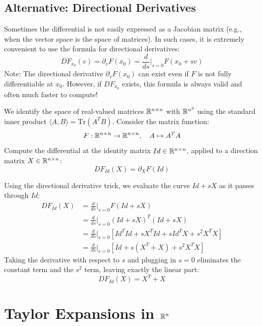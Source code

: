 \subsection*{Alternative: Directional Derivatives}
Sometimes the differential is not easily expressed as a Jacobian matrix (e.g., when the vector space is the space of matrices). In such cases, it is extremely convenient to use the formula for directional derivatives:
\[ DF_{x_0}(v) = \partial_v F(x_0) = \frac{d}{ds}\bigg|_{s=0} F(x_0 + sv) \]
\textcolor{eGray}{Note: The directional derivative $\partial_v F(x_0)$ can exist even if $F$ is not fully differentiable at $x_0$. However, if $DF_{x_0}$ exists, this formula is always valid and often much faster to compute!}

\begin{exercise*}
We identify the space of real-valued matrices $\mathbb{R}^{n \times n}$ with $\mathbb{R}^{n^2}$ using the standard inner product $\langle A, B \rangle = \text{Tr}(A^T B)$. 
Consider the matrix function:
\[ F: \mathbb{R}^{n \times n} \to \mathbb{R}^{n \times n}, \quad A \mapsto A^T A \]
Compute the differential at the identity matrix $Id \in \mathbb{R}^{n \times n}$, applied to a direction matrix $X \in \mathbb{R}^{n \times n}$:
\[ DF_{Id}(X) = \partial_X F(Id) \]
\end{exercise*}

\begin{solution}
Using the directional derivative trick, we evaluate the curve $Id + sX$ as it passes through $Id$:
\begin{equation}
    \begin{aligned}
        DF_{Id}(X) &= \frac{d}{ds}\bigg|_{s=0} F(Id + sX) \\
        &= \frac{d}{ds}\bigg|_{s=0} (Id + sX)^T (Id + sX) \\
        &= \frac{d}{ds}\bigg|_{s=0} [Id^T Id + sX^T Id + s Id^T X + s^2 X^T X] \\
        &= \frac{d}{ds}\bigg|_{s=0} [Id + s(X^T + X) + s^2 X^T X]
    \end{aligned}
\end{equation}
Taking the derivative with respect to $s$ and plugging in $s=0$ eliminates the constant term and the $s^2$ term, leaving exactly the linear part:
\[ DF_{Id}(X) = X^T + X \]
\end{solution}

\hrulefill

\section{Taylor Expansions in $\mathbb{R}^n$}

